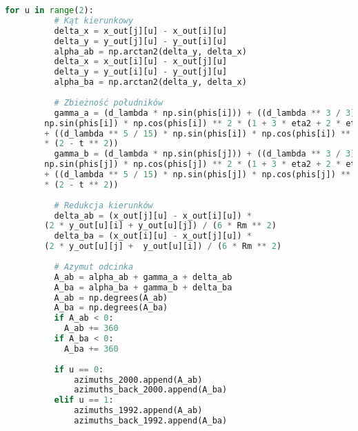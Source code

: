 \documentclass[fleqn,10pt,a4paper]{article}
\begin{document}
\begin{lstlisting}[language=Python, caption=Redukcje odległości i azymutów, label = kod:redukcje, style=mycode]
      for u in range(2):
          # Kąt kierunkowy
          delta_x = x_out[j][u] - x_out[i][u]
          delta_y = y_out[j][u] - y_out[i][u]
          alpha_ab = np.arctan2(delta_y, delta_x)
          delta_x = x_out[i][u] - x_out[j][u]
          delta_y = y_out[i][u] - y_out[j][u]
          alpha_ba = np.arctan2(delta_y, delta_x)
  
          # Zbieżność południków
          gamma_a = (d_lambda * np.sin(phis[i])) + ((d_lambda ** 3 / 3) * 
        np.sin(phis[i]) * np.cos(phis[i]) ** 2 * (1 + 3 * eta2 + 2 * eta2 ** 2)) 
        + ((d_lambda ** 5 / 15) * np.sin(phis[i]) * np.cos(phis[i]) ** 4 
        * (2 - t ** 2)) 
          gamma_b = (d_lambda * np.sin(phis[j])) + ((d_lambda ** 3 / 3) * 
        np.sin(phis[j]) * np.cos(phis[j]) ** 2 * (1 + 3 * eta2 + 2 * eta2 ** 2))
        + ((d_lambda ** 5 / 15) * np.sin(phis[j]) * np.cos(phis[j]) ** 4 
        * (2 - t ** 2))
          
          # Redukcja kierunków
          delta_ab = (x_out[j][u] - x_out[i][u]) * 
        (2 * y_out[u][i] + y_out[u][j]) / (6 * Rm ** 2)
          delta_ba = (x_out[i][u] - x_out[j][u]) * 
        (2 * y_out[u][j] +  y_out[u][i]) / (6 * Rm ** 2)
  
          # Azymut odcinka
          A_ab = alpha_ab + gamma_a + delta_ab
          A_ba = alpha_ba + gamma_b + delta_ba
          A_ab = np.degrees(A_ab)
          A_ba = np.degrees(A_ba)
          if A_ab < 0:
            A_ab += 360
          if A_ba < 0:
            A_ba += 360
  
          if u == 0:
              azimuths_2000.append(A_ab)
              azimuths_back_2000.append(A_ba)
          elif u == 1:
              azimuths_1992.append(A_ab)
              azimuths_back_1992.append(A_ba)
\end{lstlisting}

\newpage
\listoftables
\lstlistoflistings
\end{document}
